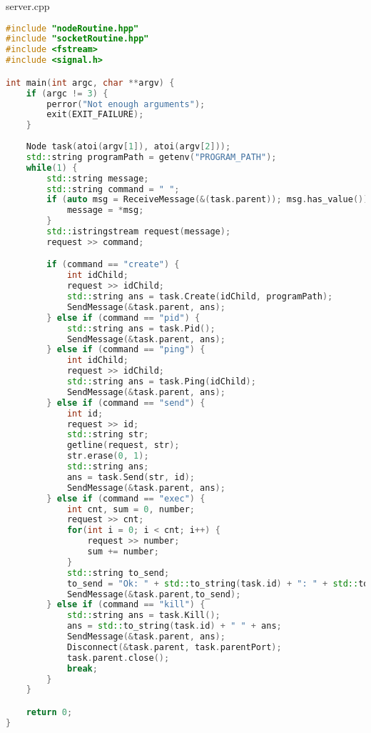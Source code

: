 \documentclass[a4paper, 12pt]{article}
\begin{document}
server.cpp
\begin{lstlisting}[language=C++]
#include "nodeRoutine.hpp"
#include "socketRoutine.hpp"
#include <fstream>
#include <signal.h>

int main(int argc, char **argv) {
    if (argc != 3) {
        perror("Not enough arguments");
        exit(EXIT_FAILURE);
    }
    
    Node task(atoi(argv[1]), atoi(argv[2]));
    std::string programPath = getenv("PROGRAM_PATH");
    while(1) {
        std::string message;
        std::string command = " ";
        if (auto msg = ReceiveMessage(&(task.parent)); msg.has_value()) {
            message = *msg;
        }
        std::istringstream request(message);
        request >> command;

        if (command == "create") {
            int idChild;
            request >> idChild;
            std::string ans = task.Create(idChild, programPath);
            SendMessage(&task.parent, ans);
        } else if (command == "pid") {
            std::string ans = task.Pid();
            SendMessage(&task.parent, ans);
        } else if (command == "ping") {
            int idChild;
            request >> idChild;
            std::string ans = task.Ping(idChild);
            SendMessage(&task.parent, ans);
        } else if (command == "send") {
            int id;
            request >> id;
            std::string str;
            getline(request, str);
            str.erase(0, 1);
            std::string ans;
            ans = task.Send(str, id);
            SendMessage(&task.parent, ans);
        } else if (command == "exec") {
            int cnt, sum = 0, number;
            request >> cnt;
            for(int i = 0; i < cnt; i++) {
                request >> number;
                sum += number;
            }
            std::string to_send;
            to_send = "Ok: " + std::to_string(task.id) + ": " + std::to_string(sum);
            SendMessage(&task.parent,to_send);
        } else if (command == "kill") {
            std::string ans = task.Kill();
            ans = std::to_string(task.id) + " " + ans;
            SendMessage(&task.parent, ans);
            Disconnect(&task.parent, task.parentPort);
            task.parent.close();
            break;
        }
    }

    return 0;
}
\end{lstlisting}
\end{document}
